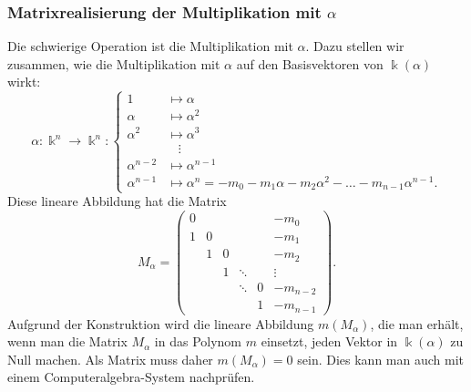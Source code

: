 \subsubsection{Matrixrealisierung der Multiplikation mit $\alpha$}
Die schwierige Operation ist die Multiplikation mit $\alpha$.
Dazu stellen wir zusammen, wie die Multiplikation mit $\alpha$ auf den
Basisvektoren von $\Bbbk(\alpha)$ wirkt:
\[
\alpha\colon
\Bbbk^n\to\Bbbk^n
:
\left\{
\begin{aligned}
     1  &\mapsto \alpha   \\
\alpha  &\mapsto \alpha^2 \\
\alpha^2&\mapsto \alpha^3 \\
        &\phantom{m}\vdots\\
\alpha^{n-2}&\mapsto \alpha^{n-1}\\
\alpha^{n-1}&\mapsto \alpha^n = -m_0-m_1\alpha-m_2\alpha^2-\dots-m_{n-1}\alpha^{n-1}.
\end{aligned}
\right.
\]
Diese lineare Abbildung hat die Matrix
\[
M_{\alpha}
=
\begin{pmatrix}
0   &    &    &      &   &-m_0    \\
1   & 0  &    &      &   &-m_1    \\
    & 1  & 0  &      &   &-m_2    \\
    &    & 1  &\ddots&   &\vdots  \\
    &    &    &\ddots& 0 &-m_{n-2}\\
    &    &    &      & 1 &-m_{n-1}
\end{pmatrix}.
\]
Aufgrund der Konstruktion wird die lineare Abbildung $m(M_\alpha)$,
die man erhält, wenn
man die Matrix $M_\alpha$ in das Polynom $m$ einsetzt, jeden Vektor
in $\Bbbk(\alpha)$ zu Null machen.
Als Matrix muss daher $m(M_\alpha)=0$ sein.
Dies kann man auch mit einem Computeralgebra-System nachprüfen.

